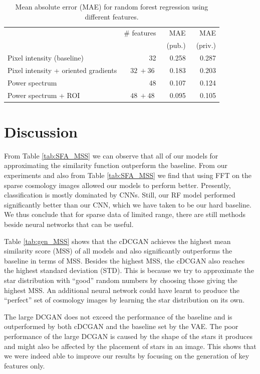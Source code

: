 \documentclass[10pt,conference,compsocconf]{IEEEtran}
\begin{document}
\begin{table}\centering
    \begin{tabular}{lrrr}
    \toprule
        & \# features & MAE & MAE \\
        & & ~(pub.) & ~(priv.) \\
    \midrule
        Pixel intensity (baseline) & \SI{32}{} & \SI{0.258}{} & \SI{0.287}{}  \\
        Pixel intensity + oriented gradients & $\SI{32}{} + \SI{36}{}$ & \SI{0.183}{} & \SI{0.203}{} \\
        Power spectrum & \SI{48}{} & \SI{0.107}{} & \SI{0.124}{} \\
        Power spectrum + ROI & $\SI{48}{} + \SI{48}{}$ & \SI{0.095}{} & \SI{0.105}{} \\
    \bottomrule
    \end{tabular}
\caption{Mean absolute error (MAE) for random forest regression using different features.}
\label{tab:RF}
\end{table}

\section{Discussion}

From Table \ref{tab:SFA_MSS} we can observe that all of our models for approximating the similarity function outperform the baseline. From our experiments and also from Table \ref{tab:SFA_MSS} we find that using FFT on the sparse cosmology images allowed our models to perform better. Presently, classification is mostly dominated by CNNs. Still, our RF model performed significantly better than our CNN, which we have taken to be our hard baseline. We thus conclude that for sparse data of limited range, there are still methods beside neural networks that can be useful. 

Table \ref{tab:gen_MSS} shows that the cDCGAN achieves the highest mean similarity score (MSS) of all models and also significantly outperforms the baseline in terms of MSS. Besides the highest MSS, the cDCGAN also reaches the highest standard deviation (STD). This is because we try to approximate the star distribution with ``good'' random numbers by choosing those giving the highest MSS. An additional neural network could have learnt to produce the ``perfect'' set of cosmology images by learning the star distribution on its own. %

The large DCGAN does not exceed the performance of the baseline and is outperformed by both cDCGAN and the baseline set by the VAE. The poor performance of the large DCGAN is caused by the shape of the stars it produces and might also be affected by the placement of stars in an image. This shows that we were indeed able to improve our results by focusing on the generation of key features only.
\end{document}
